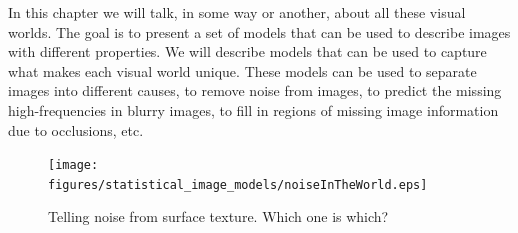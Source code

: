%
%
%
%
In this chapter we will talk, in some way or another, about all these visual worlds. The goal is to present a set of models that can be used to describe images with different properties. We will describe models that can be used to capture what makes each visual world unique. 
These models can be used to separate images into different causes, to remove noise from images, to predict the missing high-frequencies in blurry images, to fill in regions of missing image information due to occlusions, etc.




\begin{figure}[t]
\centerline{
\texttt{[image: figures/statistical\_image\_models/noiseInTheWorld.eps]}
} 
\caption{Telling noise from surface texture. Which one is which?} 
\label{fig:noiseInTheWorld}
\end{figure}





% 

